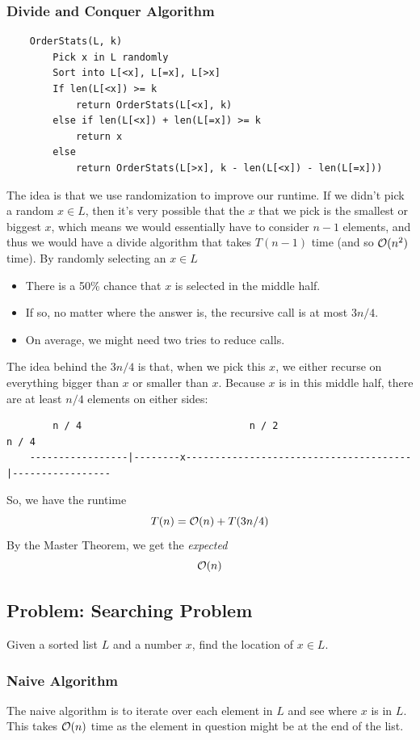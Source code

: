 \documentclass[letterpaper]{article}
\begin{document}
\subsubsection{Divide and Conquer Algorithm}
\begin{verbatim}
    OrderStats(L, k)
        Pick x in L randomly 
        Sort into L[<x], L[=x], L[>x]
        If len(L[<x]) >= k
            return OrderStats(L[<x], k)
        else if len(L[<x]) + len(L[=x]) >= k
            return x 
        else 
            return OrderStats(L[>x], k - len(L[<x]) - len(L[=x]))
\end{verbatim}
The idea is that we use randomization to improve our runtime. If we didn't pick a random $x \in L$, then it's very possible that the $x$ that we pick is the smallest or biggest $x$, which means we would essentially have to consider $n - 1$ elements, and thus we would have a divide algorithm that takes $T(n - 1)$ time (and so $\mathcal{O}(n^2)$ time). By randomly selecting an $x \in L$
\begin{itemize}
    \item There is a 50\% chance that $x$ is selected in the middle half. 
    \item If so, no matter where the answer is, the recursive call is at most $3n / 4$. 
    \item On average, we might need two tries to reduce calls. 
\end{itemize}
The idea behind the $3n / 4$ is that, when we pick this $x$, we either recurse on everything bigger than $x$ or smaller than $x$. Because $x$ is in this middle half, there are at least $n / 4$ elements on either sides: 
\begin{verbatim}
        n / 4                             n / 2                                 n / 4  
    -----------------|--------x---------------------------------------|-----------------
\end{verbatim}
So, we have the runtime 
\[T(n) = \mathcal{O}(n) + T(3n / 4)\]
By the Master Theorem, we get the \emph{expected}  
\[\mathcal{O}(n)\]


\subsection{Problem: Searching Problem}
Given a sorted list $L$ and a number $x$, find the location of $x \in L$.

\subsubsection{Naive Algorithm}
The naive algorithm is to iterate over each element in $L$ and see where $x$ is in $L$. This takes $\mathcal{O}(n)$ time as the element in question might be at the end of the list.  
\end{document}
